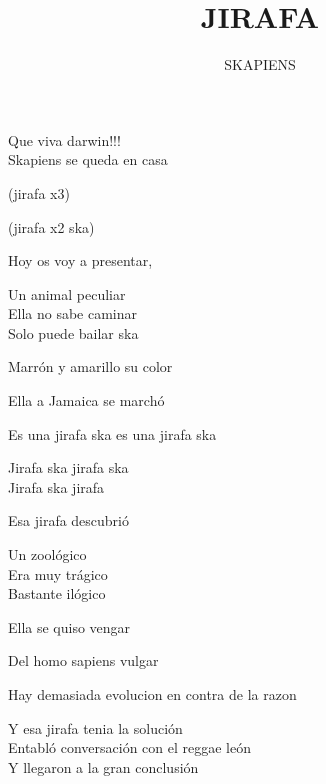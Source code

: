 \documentclass[12pt, a4papre]{article}
\author{SKAPIENS}
\title{JIRAFA}
\date{}
\begin{document}
	\maketitle
	\begin{center}
		Que viva darwin!!!\\
		Skapiens se queda en casa\\
		
		\begin{doublespacing}
		(jirafa x3) \\
		\end{doublespacing}
		(jirafa x2 ska)\\
		
		\begin{doublespacing}
		Hoy os voy a presentar,\\
		\end{doublespacing}
		Un animal peculiar\\
		Ella no sabe caminar\\
		Solo puede bailar ska\\
		
		\begin{doublespacing}
		Marrón y amarillo su color\\
		\end{doublespacing}
		Ella a Jamaica se marchó\\
		
		\begin{doublespacing}
		Es una jirafa ska es una jirafa ska\\
		\end{doublespacing}
		Jirafa ska jirafa ska\\
		Jirafa ska jirafa\\
		
		\begin{doublespacing}
		Esa jirafa descubrió\\
		\end{doublespacing}
		Un zoológico\\
		Era muy trágico\\
		Bastante ilógico\\
		
		\begin{doublespacing}
		Ella se quiso vengar\\
		\end{doublespacing}
		Del homo sapiens vulgar\\
		
		\begin{doublespacing}
		Hay demasiada evolucion en contra de la razon\\
		\end{doublespacing}
		Y esa jirafa tenia la solución\\
		Entabló conversación con el reggae león\\
		Y llegaron a la gran conclusión\\
		

\end{center}
\end{document}

